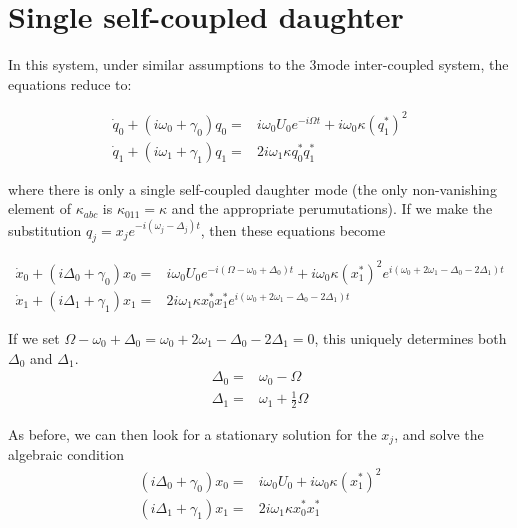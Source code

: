 \section*{Single self-coupled daughter}

In this system, under similar assumptions to the 3mode inter-coupled system, the equations reduce to:

\begin{subequations}
\begin{align}
\dot{q}_0 + (i\omega_0 + \gamma_0) q_0 = & i\omega_0 U_0 e^{-i\Omega t} + i\omega_0 \kappa (q_1^\ast)^2 \label{subeq:single_mode_p} \\
\dot{q}_1 + (i\omega_1 + \gamma_1) q_1 = & 2i\omega_1 \kappa q_0^\ast q_1^\ast \label{subeq:single_mode_d} 
\end{align}
\end{subequations}

where there is only a single self-coupled daughter mode (the only non-vanishing element of $\kappa_{abc}$ is $\kappa_{011}=\kappa$ and the appropriate perumutations). If we make the substitution $q_j = x_j e^{-i(\omega_j - \Delta_j)t}$, then these equations become

\begin{subequations}
\begin{align}
\dot{x}_0 + (i\Delta_0 + \gamma_0) x_0 = & i\omega_0 U_0 e^{-i(\Omega - \omega_0 + \Delta_0) t} + i\omega_0 \kappa (x_1^\ast)^2 e^{i(\omega_0 + 2\omega_1 - \Delta_0 - 2\Delta_1)t} \\
\dot{x}_1 + (i\Delta_1 + \gamma_1) x_1 = & 2i\omega_1 \kappa x_0^\ast x_1^\ast e^{i(\omega_0 + 2\omega_1 - \Delta_0 -2\Delta_1) t}
\end{align}
\end{subequations}

If we set $\Omega - \omega_0 + \Delta_0 = \omega_0 + 2\omega_1 - \Delta_0 - 2\Delta_1 = 0$, this uniquely determines both $\Delta_0$ and $\Delta_1$.
\begin{subequations}
\begin{align}
\Delta_0 = & \omega_0 - \Omega \\
\Delta_1 = & \omega_1 + \frac{1}{2} \Omega
\end{align}
\end{subequations}

As before, we can then look for a stationary solution for the $x_j$, and solve the algebraic condition
\begin{subequations}
\begin{align}
(i\Delta_0 + \gamma_0) x_0 = & i\omega_0 U_0 + i\omega_0 \kappa (x_1^\ast)^2 \label{single_mode_p} \\
(i\Delta_1 + \gamma_1) x_1 = & 2i\omega_1 \kappa x_0^\ast x_1^\ast \label{single_mode_d}
\end{align}
\end{subequations}

